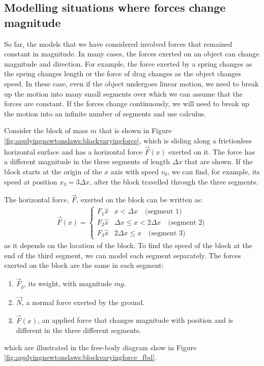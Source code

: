 \subsection{Modelling situations where forces change magnitude}
So far, the models that we have considered involved forces that remained constant in magnitude. In many cases, the forces exerted on an object can change magnitude and direction. For example, the force exerted by a spring changes as the spring changes length or the force of drag changes as the object changes speed. In these case, even if the object undergoes linear motion, we need to break up the motion into many small segments over which we can assume that the forces are constant. If the forces change continuously, we will need to break up the motion into an infinite number of segments and use calculus.

Consider the block of mass $m$ that is shown in Figure \ref{fig:applyingnewtonslaws:blockvaryingforce}, which is sliding along a frictionless horizontal surface and has a  horizontal force $\vec F(x)$ exerted on it. The force has a different magnitude in the three segments of length $\Delta x$ that are shown. If the block starts at the origin of the $x$ axis with speed $v_0$, we can find, for example, its speed at position $x_3=3\Delta x$, after the block travelled through the three segments.


The horizontal force, $\vec F$, exerted on the block can be written as:
\begin{align*}
  \vec F (x)=
  \begin{cases}
    F_1\hat x & x<\Delta x \quad \text{(segment 1)}\\
    F_2\hat x & \Delta x \leq x< 2\Delta x \quad \text{(segment 2)}\\
    F_3\hat x & 2\Delta x \leq x\quad \text{(segment 3)}
  \end{cases}
\end{align*}
as it depends on the location of the block. To find the speed of the block at the end of the third segment, we can model each segment separately. The forces exerted on the block are the same in each segment:
\begin{enumerate}
\item $\vec F_g$, its weight, with magnitude $mg$.
\item $\vec N$, a normal force exerted by the ground.
\item $\vec F(x)$, an applied force that changes magnitude with position and is different in the three different segments.
\end{enumerate}
which are illustrated in the free-body diagram show in Figure \ref{fig:applyingnewtonslaws:blockvaryingforce_fbd}.

